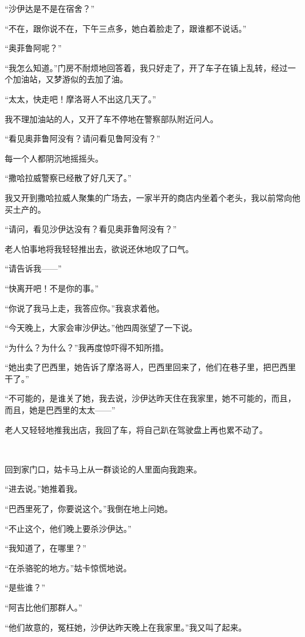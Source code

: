 \par “沙伊达是不是在宿舍？”
\par “不在，跟你说不在，下午三点多，她白着脸走了，跟谁都不说话。”
\par “奥菲鲁阿呢？”
\par “我怎么知道。”门房不耐烦地回答着，我只好走了，开了车子在镇上乱转，经过一个加油站，又梦游似的去加了油。
\par “太太，快走吧！摩洛哥人不出这几天了。”
\par 我不理加油站的人，又开了车不停地在警察部队附近问人。
\par “看见奥菲鲁阿没有？请问看见鲁阿没有？”
\par 每一个人都阴沉地摇摇头。
\par “撒哈拉威警察已经散了好几天了。”
\par 我又开到撒哈拉威人聚集的广场去，一家半开的商店内坐着个老头，我以前常向他买土产的。
\par “请问，看见沙伊达没有？看见奥菲鲁阿没有？”
\par 老人怕事地将我轻轻推出去，欲说还休地叹了口气。
\par “请告诉我——”
\par “快离开吧！不是你的事。”
\par “你说了我马上走，我答应你。”我哀求着他。
\par “今天晚上，大家会审沙伊达。”他四周张望了一下说。
\par “为什么？为什么？”我再度惊吓得不知所措。
\par “她出卖了巴西里，她告诉了摩洛哥人，巴西里回来了，他们在巷子里，把巴西里干了。”
\par “不可能的，是谁关了她，我去说，沙伊达昨天住在我家里，她不可能的，而且，而且，她是巴西里的太太——”
\par 老人又轻轻地推我出店，我回了车，将自己趴在驾驶盘上再也累不动了。
\par  
\par 回到家门口，姑卡马上从一群谈论的人里面向我跑来。
\par “进去说。”她推着我。
\par “巴西里死了，你要说这个。”我倒在地上问她。
\par “不止这个，他们晚上要杀沙伊达。”
\par “我知道了，在哪里？”
\par “在杀骆驼的地方。”姑卡惊慌地说。
\par “是些谁？”
\par “阿吉比他们那群人。”
\par “他们故意的，冤枉她，沙伊达昨天晚上在我家里。”我又叫了起来。
